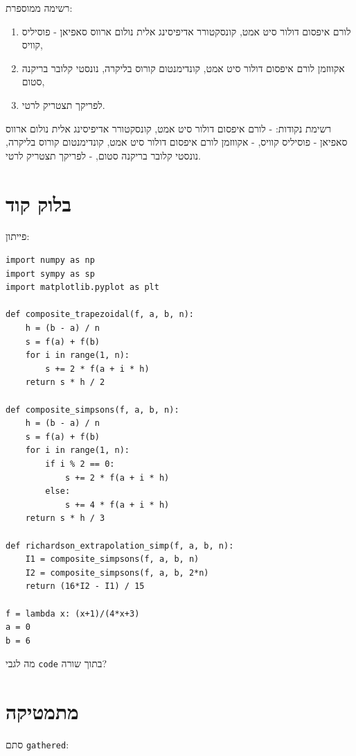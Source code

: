 \documentclass[a4paper,]{article}
\providecommand{\tightlist}{%
  \setlength{\itemsep}{0pt}\setlength{\parskip}{0pt}}
\begin{document}
רשימה ממוספרת:

\begin{enumerate}
  \def\labelenumi{\arabic{enumi}.}
  \tightlist
  \item
        לורם איפסום דולור סיט אמט, קונסקטורר אדיפיסינג אלית נולום ארווס סאפיאן
        - פוסיליס קוויס,
  \item
        אקווזמן לורם איפסום דולור סיט אמט, קונדימנטום קורוס בליקרה, נונסטי
        קלובר בריקנה סטום,
  \item
        לפריקך תצטריק לרטי.
\end{enumerate}

רשימת נקודות: - לורם איפסום דולור סיט אמט, קונסקטורר אדיפיסינג אלית
נולום ארווס סאפיאן - פוסיליס קוויס, - אקווזמן לורם איפסום דולור סיט אמט,
קונדימנטום קורוס בליקרה, נונסטי קלובר בריקנה סטום, - לפריקך תצטריק לרטי.

\section{בלוק קוד}\label{ux5d1ux5dcux5d5ux5e7-ux5e7ux5d5ux5d3}

פייתון:

\begin{verbatim}
import numpy as np
import sympy as sp
import matplotlib.pyplot as plt

def composite_trapezoidal(f, a, b, n):
    h = (b - a) / n
    s = f(a) + f(b)
    for i in range(1, n):
        s += 2 * f(a + i * h)
    return s * h / 2

def composite_simpsons(f, a, b, n):
    h = (b - a) / n
    s = f(a) + f(b)
    for i in range(1, n):
        if i % 2 == 0:
            s += 2 * f(a + i * h)
        else:
            s += 4 * f(a + i * h)
    return s * h / 3

def richardson_extrapolation_simp(f, a, b, n):
    I1 = composite_simpsons(f, a, b, n)
    I2 = composite_simpsons(f, a, b, 2*n)
    return (16*I2 - I1) / 15

f = lambda x: (x+1)/(4*x+3)
a = 0
b = 6
\end{verbatim}

מה לגבי \texttt{code} בתוך שורה?

\section{מתמטיקה}\label{ux5deux5eaux5deux5d8ux5d9ux5e7ux5d4}

סתם \texttt{gathered}:
\end{document}
